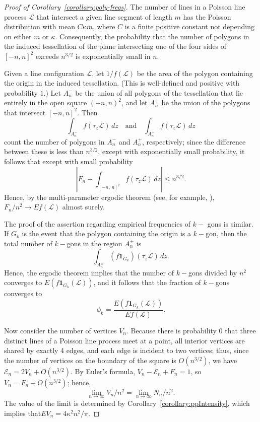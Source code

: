 \documentclass[AHL, Unicode, longabstracts, published]{cedram}
\begin{document}
\begin{proof}[Proof of Corollary~\ref{corollary:poly-freqs}]
The number of lines in a Poisson line process $\mathcal{L}$ that intersect a given line segment of length $m$ has the Poisson distribution with mean $C{\kappa}m$, where $C$ is a finite positive constant not depending on either $m$ or $\kappa$. Consequently, the probability that the number of polygons in the induced tessellation of the plane intersecting one of the four sides of $[-n,n]^{2}$ exceeds $n^{3/2}$ is exponentially small in $n$.

Given a line configuration $\mathcal{L}$, let $1/f (\mathcal{L})$ be the area of the polygon containing the origin in the induced tessellation. (This is well-defined and positive with probability $1$.) Let $A^{-}_{n}$ be the union of all polygons of the tessellation that lie entirely in the open square $(-n,n)^{2}$, and let $A^{+}_{n}$ be the union of the polygons that intersect $[-n,n]^{2}$. Then
\[
\int_{A^{-}_{n}} f (\tau_{z}\mathcal{L}) \,dz\quad \text{and} \quad \int_{A^{+}_{n}} f (\tau_{z}\mathcal{L}) \,dz
\]
count the number of polygons in $A^{-}_{n}$ and $A^{+}_{n}$, respectively; since the difference between these is less than $n^{3/2}$, except with exponentially small probability, it follows that except with small probability
\[
\left\lvert F_{n}- \int_{[-n,\,n]^{2}} f (\tau_{z}\mathcal{L})
\,dz\right\rvert \leq n^{3/2}.
\]
Hence, by the multi-parameter ergodic theorem (see, for example, \cite{Calderon}), $F_{n}/n^{2}\rightarrow Ef(\mathcal{L})$ almost surely.

The proof of the assertion regarding empirical frequencies of $k-$ gons is similar. If $G_{k}$ is the event that the polygon containing the origin is a $k-$gon, then the total number of $k-$gons in the region $A^{\pm}_{n}$ is
\[
\int_{A^{\pm}_{n}} (f\mathbf{1}_{G_{k}}) (\tau_{z}\mathcal{L})\,dz.
\]
Hence, the ergodic theorem implies that the number of $k-$gons divided by $n^{2}$ converges to $E (f\textbf{1}_{G_{k}} (\mathcal{L}))$, and it follows that the fraction of $k-$gons converges to
\[
\phi _{k}=\frac{E (f\textbf{1}_{G_{k}} (\mathcal{L}))}{Ef (\mathcal{L})}.
\]


Now consider the number of vertices $V_{n}$. Because there is probability $0$ that three distinct lines of a Poisson line process meet at a point, all interior vertices are shared by exactly 4 edges, and each edge is incident to two vertices; thus, since the number of vertices on the boundary of the square is $O (n^{3/2})$, we have $\mathcal{E}_{n}=2V_{n}+O (n^{3/2})$. By Euler's formula, $V_{n}-\mathcal{E}_{n}+F_{n}=1$, so $V_{n}=F_{n}+O (n^{3/2})$; hence,
\[
\lim_{n \rightarrow \infty }V_{n}/n^{2} = \lim_{n \rightarrow
\infty }N_{n}/n^{2}.
\]
The value of the limit is determined by Corollary~\ref{corollary:ppIntensity}, which implies that\linebreak$EV_{n}=4\kappa^{2}n^{2}/\pi.$
\end{proof}




\end{document}

